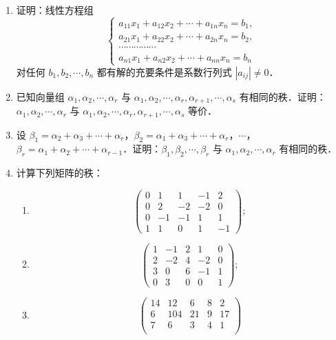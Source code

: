 \begin{enumerate}
  \anscompute
  \item 证明：线性方程组
  \[
    \begin{cases}
      a_{11}x_1+a_{12}x_2+\cdots+a_{1n}x_n=b_1,\\
      a_{21}x_1+a_{22}x_2+\cdots+a_{2n}x_n=b_2,\\
      \cdots\cdots\cdots\cdots\cdots\\
      a_{n1}x_1+a_{n2}x_2+\cdots+a_{nn}x_n=b_n
    \end{cases}
  \]
  对任何 $b_1,b_2,\cdots,b_n$ 都有解的充要条件是系数行列式 $|a_{ij}|\ne 0$．
  \ansproof
  \item 已知向量组 $\alpha_1,\allowbreak \alpha_2,\allowbreak \cdots,\allowbreak \alpha_r$ 与 $\alpha_1,\allowbreak \alpha_2,\allowbreak \cdots,\allowbreak \alpha_r,\allowbreak \alpha_{r+1},\allowbreak \cdots,\allowbreak \alpha_s$ 有相同的秩．证明：$\alpha_1,\allowbreak \alpha_2,\allowbreak \cdots,\allowbreak \alpha_r$ 与 $\alpha_1,\allowbreak \alpha_2,\allowbreak \cdots,\allowbreak \alpha_r,\allowbreak \alpha_{r+1},\allowbreak \cdots,\allowbreak \alpha_s$ 等价．
  \ansproof
  \item 设 $\beta_1=\alpha_2+\alpha_3+\cdots+\alpha_r$，$\beta_2=\alpha_1+\alpha_3+\cdots+\alpha_r$，$\cdots$，$\beta_r=\alpha_1+\alpha_2+\cdots+\alpha_{r-1}$．证明：$\beta_1,\beta_2,\cdots,\beta_r$ 与 $\alpha_1,\alpha_2,\cdots,\alpha_r$ 有相同的秩．
  \ansproof
  \item 计算下列矩阵的秩：
  \begin{enumerate}
    \item \[
      \begin{pmatrix}
        0&1&1&-1&2\\
        0&2&-2&-2&0\\
        0&-1&-1&1&1\\
        1&1&0&1&-1
      \end{pmatrix};
    \]
  \anssub
    \item \[
      \begin{pmatrix}
        1&-1&2&1&0\\
        2&-2&4&-2&0\\
        3&0&6&-1&1\\
        0&3&0&0&1
      \end{pmatrix};
    \]
  \anssub
    \item \[
      \begin{pmatrix}
        14&12&6&8&2\\
        6&104&21&9&17\\
        7&6&3&4&1\\

\end{pmatrix}\]
\end{enumerate}
\end{enumerate}
